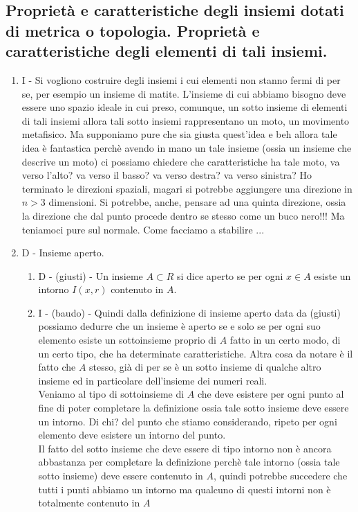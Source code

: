 \documentclass[]{article}
\begin{document}
\subsection{Propriet\`a e caratteristiche degli insiemi dotati di metrica o topologia. Propriet\`a e caratteristiche degli elementi di tali insiemi.}
\begin{enumerate}
  \item I - Si vogliono costruire degli insiemi i cui elementi non stanno fermi di per se, per esempio un insieme di matite. L'insieme di cui abbiamo bisogno deve essere uno spazio ideale in cui preso, comunque, un sotto insieme di elementi di tali insiemi allora tali sotto insiemi rappresentano un moto, un movimento metafisico. Ma supponiamo pure che sia giusta quest'idea e beh allora tale idea \`e fantastica perch\`e avendo in mano un tale insieme (ossia un insieme che descrive un moto) ci possiamo chiedere che caratteristiche ha tale moto, va verso l'alto? va verso il basso? va verso destra? va verso sinistra? Ho terminato le direzioni spaziali, magari si potrebbe aggiungere una direzione in $n>3$ dimensioni. Si potrebbe, anche, pensare ad una quinta direzione, ossia la direzione che dal punto procede dentro se stesso come un buco nero!!! Ma teniamoci pure sul normale. Come facciamo a stabilire ...
  \item D - Insieme aperto.
	\begin{enumerate}
	  \item D - (giusti) - Un insieme $A \subset R$ si dice aperto se per ogni $x \in A$ esiste un intorno $I(x,r)$ contenuto in $A$.
	  \item I - (baudo) - Quindi dalla definizione di insieme aperto data da (giusti) possiamo dedurre che un insieme \`e aperto se e solo se per ogni suo elemento esiste un sottoinsieme proprio di $A$ fatto in un certo modo, di un certo tipo, che ha determinate caratteristiche. Altra cosa da notare \`e il fatto che $A$ stesso, gi\`a di per se \`e un sotto insieme di qualche altro insieme ed in particolare dell'insieme dei numeri reali. \\
	  Veniamo al tipo di sottoinsieme di $A$ che deve esistere per ogni punto al fine di poter completare la definizione ossia tale sotto insieme deve essere un intorno. Di chi? del punto che stiamo considerando, ripeto per ogni elemento deve esistere un intorno del punto. \\
	  Il fatto del sotto insieme che deve essere di tipo intorno non \`e ancora abbastanza per completare la definizione perch\`e tale intorno (ossia tale sotto insieme) deve essere contenuto in $A$, quindi potrebbe succedere che tutti i punti abbiamo un intorno ma qualcuno di questi intorni non \`e totalmente contenuto in $A$ \\

\end{enumerate}
\end{enumerate}
\end{document}
